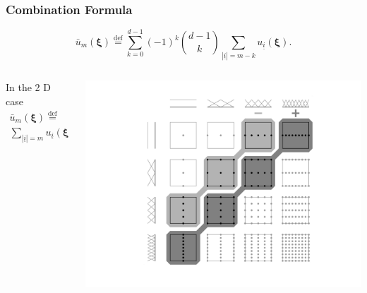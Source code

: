 \documentclass[11pt,ucs]{beamer}
\begin{document}
\begin{frame}\frametitle{Combination Formula}

\begin{equation*}
\bar u_{m}(\boldsymbol{\xi})  \overset{\text{def}}{=}  \sum_{k=0}^{d-1}(-1)^{k}\binom{d-1}{k}\sum_{|\underline{i}|=m-k}u_{\underline{i}}(\boldsymbol{\xi}) .
\end{equation*}



\begin{columns}
\begin{column}{0.4\textwidth}
In the 2 D case
\begin{gather*}
\bar u_{m}(\boldsymbol{\xi})  \overset{\text{def}}{=}  \\
\sum_{|\underline{i}|=m}u_{\underline{i}}(\boldsymbol{\xi})  
 - \sum_{|\underline{i}|=m-1}u_{\underline{i}}(\boldsymbol{\xi}) .
\end{gather*}
\end{column}

\begin{column}{0.6\textwidth}

\centering
\includegraphics[width=1.1\textwidth]{combination_linear.png}


\end{column}

\end{columns}


%

\end{frame}
\end{document}
